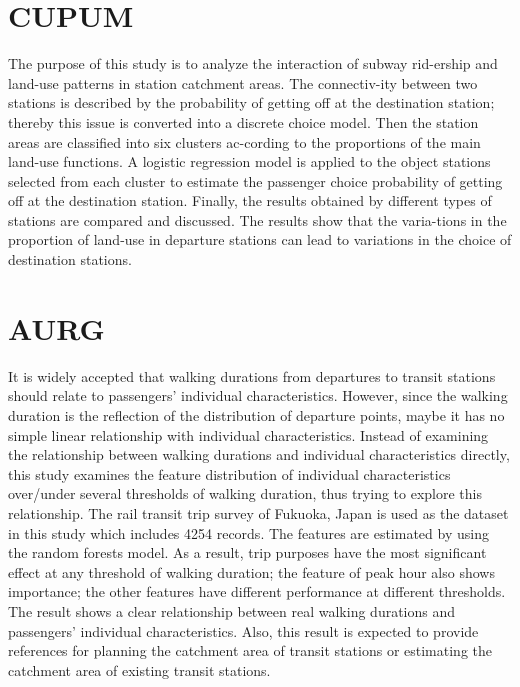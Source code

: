 \documentclass[12pt, oneside, a4paper]{book}
\begin{document}
\section{CUPUM}
The purpose of this study is to analyze the interaction of subway rid-ership and land-use patterns in station catchment areas. The connectiv-ity between two stations is described by the probability of getting off at the destination station; thereby this issue is converted into a discrete choice model. Then the station areas are classified into six clusters ac-cording to the proportions of the main land-use functions. A logistic regression model is applied to the object stations selected from each cluster to estimate the passenger choice probability of getting off at the destination station. Finally, the results obtained by different types of stations are compared and discussed. The results show that the varia-tions in the proportion of land-use in departure stations can lead to variations in the choice of destination stations.

\section{AURG}
It is widely accepted that walking durations from departures to transit stations should relate to passengers' individual characteristics. However, since the walking duration is the reflection of the distribution of departure points, maybe it has no simple linear relationship with individual characteristics. Instead of examining the relationship between walking durations and individual characteristics directly, this study examines the feature distribution of individual characteristics over/under several thresholds of walking duration, thus trying to explore this relationship. The rail transit trip survey of Fukuoka, Japan is used as the dataset in this study which includes 4254 records. The features are estimated by using the random forests model. As a result, trip purposes have the most significant effect at any threshold of walking duration; the feature of peak hour also shows importance; the other features have different performance at different thresholds. The result shows a clear relationship between real walking durations and passengers' individual characteristics. Also, this result is expected to provide references for planning the catchment area of transit stations or estimating the catchment area of existing transit stations.



\mainmatter










\clearpage



\appendix


\backmatter
\end{document}
